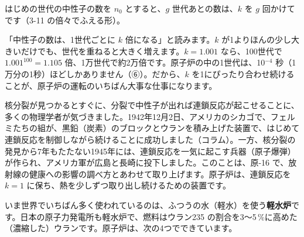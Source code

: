 はじめの世代の中性子の数を $n_0$ とすると、$g$ 世代あとの数は、$k$ を $g$ 回かけて
です（3-11 の倍々でふえる形）。

\begin{phyomi}[$n_g=n_0k^g$]
「中性子の数は、1世代ごとに $k$ 倍になる」と読みます。$k$ が1よりほんの少し大きいだけでも、世代を重ねると大きく増えます。$k=1.001$ なら、100世代で $1.001^{100}=1.105$ 倍、1万世代で約2万倍です。原子炉の中の1世代は、10$^{-4}$ 秒（1万分の1秒）ほどしかありません（⑥）。だから、$k$ を1にぴったり合わせ続けることが、原子炉の運転のいちばん大事な仕事になります。
\end{phyomi}

\begin{bkfigure}
\label{ph:原-15:fig-gen}
\end{bkfigure}

核分裂が見つかるとすぐに、分裂で中性子が出れば連鎖反応が起こせることに、多くの物理学者が気づきました。1942年12月2日、アメリカのシカゴで、フェルミたちの組が、黒鉛（炭素）のブロックとウランを積み上げた装置で、はじめて連鎖反応を制御しながら続けることに成功しました（コラム）。一方、核分裂の発見から7年もたたない1945年には、連鎖反応を一気に起こす兵器（原子爆弾）が作られ、アメリカ軍が広島と長崎に投下しました。このことは、原-16 で、放射線の健康への影響の調べ方とあわせて取り上げます。原子炉は、連鎖反応を $k=1$ に保ち、熱を少しずつ取り出し続けるための装置です。

\label{ph:原-15:sec3}
いま世界でいちばん多く使われているのは、ふつうの水（軽水）を使う\textbf{軽水炉}です。日本の原子力発電所も軽水炉で、燃料はウラン235 の割合を3〜5\,\%に高めた（濃縮した）ウランです。原子炉は、次の4つでできています。

